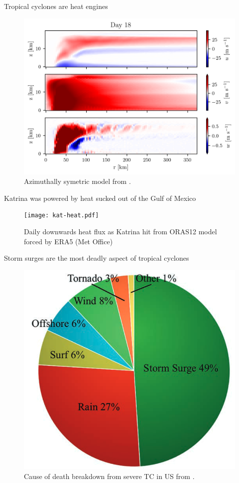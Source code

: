 \begin{frame}{Tropical cyclones are heat engines}

\vspace{-20pt}
\begin{figure}
\includegraphics[width=0.7\linewidth]{images/phd/rot-day18.png}
\caption{Azimuthally symetric model from \cite{Rotunno1987AnNumerical}. }
\end{figure}
\end{frame}

\begin{frame}{Katrina was powered by heat sucked out of the Gulf of Mexico}
    \vspace{-40pt}
    \centering

    \begin{figure}
    \texttt{[image: kat-heat.pdf]}\vspace{-30pt}
    \caption{ Daily downwards heat flux as Katrina hit from ORAS12 model forced by ERA5 (Met Office)}
    \end{figure}

\end{frame}

\begin{frame}{Storm surges are the most deadly aspect of tropical cyclones}
\begin{figure}
\includegraphics[width=0.5\linewidth]{images/phd/talea_breakdown.png}
\caption{Cause of death breakdown from severe TC in US from \cite{Mayo2019PredictingResilience}. }
\end{figure}
\end{frame}


